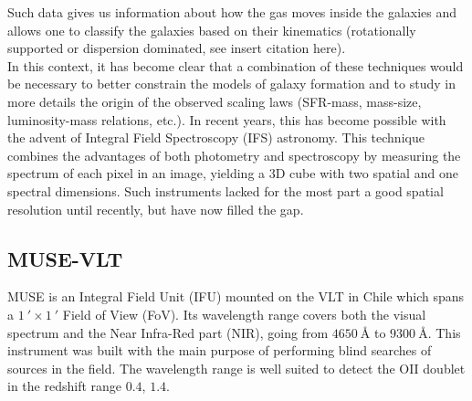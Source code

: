 Such data gives us information about how the gas moves inside the galaxies and allows one to classify the galaxies based on their kinematics (rotationally supported or dispersion dominated, see insert citation here). \\

In this context, it has become clear that a combination of these techniques would be necessary to better constrain the models of galaxy formation and to study in more details the origin of the observed scaling laws (SFR-mass, mass-size, luminosity-mass relations, etc.). In recent years, this has become possible with the advent of Integral Field Spectroscopy (IFS) astronomy. This technique combines the advantages of both photometry and spectroscopy by measuring the spectrum of each pixel in an image, yielding a 3D cube with two spatial and one spectral dimensions. Such instruments lacked for the most part a good spatial resolution until recently, but have now filled the gap. \\

\subsection{MUSE-VLT}
\label{subsec:MUSE-VLT}

MUSE is an Integral Field Unit (IFU) mounted on the VLT in Chile which spans a $\SI{1}{\arcmin} \times \SI{1}{\arcmin}$ Field of View (FoV). Its wavelength range covers both the visual spectrum and the Near Infra-Red part (NIR), going from $\SI{4650}{\angstrom}$ to $\SI{9300}{\angstrom}$. This instrument was built with the main purpose of performing blind searches of sources in the field. The wavelength range is well suited to detect the OII doublet in the redshift range $0.4$, $1.4$.